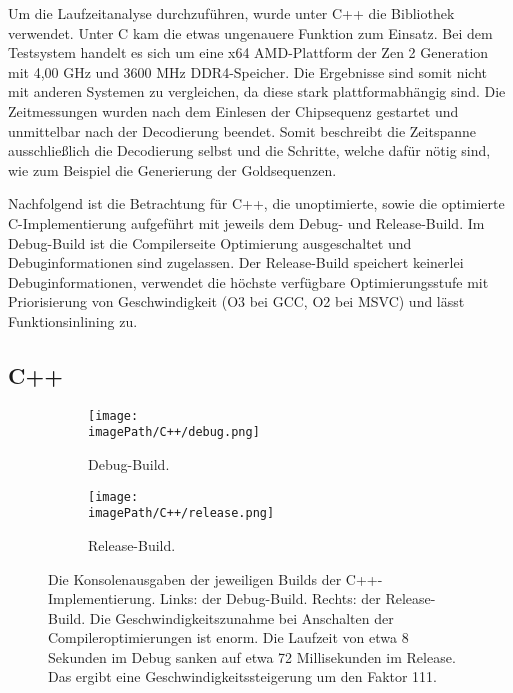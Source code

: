 Um die Laufzeitanalyse durchzuführen, wurde unter C++ die Bibliothek  verwendet. Unter C kam die etwas ungenauere Funktion  zum Einsatz. Bei dem Testsystem handelt es sich um eine x64 AMD-Plattform der Zen 2 Generation mit 4,00 GHz und 3600 MHz DDR4-Speicher. Die Ergebnisse sind somit nicht mit anderen Systemen zu vergleichen, da diese stark plattformabhängig sind. Die Zeitmessungen wurden nach dem Einlesen der Chipsequenz gestartet und unmittelbar nach der Decodierung beendet. Somit beschreibt die Zeitspanne ausschließlich die Decodierung selbst und die Schritte, welche dafür nötig sind, wie zum Beispiel die Generierung der Goldsequenzen.

Nachfolgend ist die Betrachtung für C++, die unoptimierte, sowie die optimierte C-Implementierung aufgeführt mit jeweils dem Debug- und Release-Build. 
Im Debug-Build ist die Compilerseite Optimierung ausgeschaltet und Debuginformationen sind zugelassen. Der Release-Build speichert keinerlei Debuginformationen, verwendet die höchste verfügbare Optimierungsstufe mit Priorisierung von Geschwindigkeit (O3 bei GCC, O2 bei MSVC) und lässt Funktionsinlining zu.

\subsection{C++}
\begin{figure}[H]
	\centering
	\begin{subfigure}{.5\textwidth}
		\centering
		\texttt{[image: \\imagePath/C++/debug.png]}
		\caption{Debug-Build.}
		\label{fig:cpp_debug}
	\end{subfigure}%
	\begin{subfigure}{.5\textwidth}
		\centering
		\texttt{[image: \\imagePath/C++/release.png]}
		\caption{Release-Build.}
		\label{fig:cpp_release}
	\end{subfigure}
	\caption{Die Konsolenausgaben der jeweiligen Builds der C++-Implementierung. Links: der Debug-Build. Rechts: der Release-Build. Die Geschwindigkeitszunahme bei Anschalten der Compileroptimierungen ist enorm. Die Laufzeit von etwa 8 Sekunden im Debug sanken auf etwa 72 Millisekunden im Release. Das ergibt eine Geschwindigkeitssteigerung um den Faktor 111.}
	\label{fig:cpp}
\end{figure}

